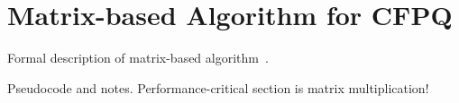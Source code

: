 \section{Matrix-based Algorithm for CFPQ}

Formal description of matrix-based algorithm~\cite{Azimov:2018:CPQ:3210259.3210264}.

Pseudocode and notes. Performance-critical section is matrix multiplication!
